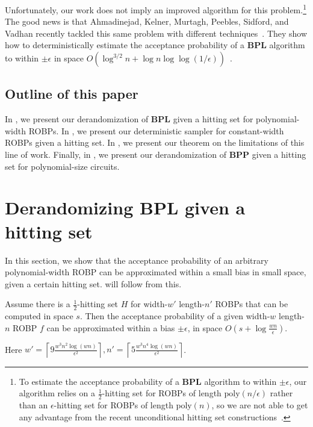 Unfortunately, our work does not imply an improved algorithm for this problem.\footnote{To estimate the acceptance probability of a $\mathbf{BPL}$ algorithm to within $\pm \epsilon$, our algorithm relies on a $\frac{1}{2}$-hitting set for ROBPs of length $\text{poly}(n/\epsilon)$ rather than an $\epsilon$-hitting set for ROBPs of length $\text{poly}(n)$, so we are not able to get any advantage from the recent unconditional hitting set constructions~\cite{BCG20,HZ20,CL20,CDRSTS21,PV21,Hoz21}.} The good news is that Ahmadinejad, Kelner, Murtagh, Peebles, Sidford, and Vadhan recently tackled this same problem with different techniques~\cite{AKMPSV20}. They show how to deterministically estimate the acceptance probability of a $\mathbf{BPL}$ algorithm to within $\pm \epsilon$ in space $O(\log^{3/2} n + \log n \log \log(1/\epsilon))$~\cite{AKMPSV20}.

\subsection{Outline of this paper}

In , we present our derandomization of $\mathbf{BPL}$ given a hitting set for polynomial-width ROBPs. In , we present our deterministic sampler for constant-width ROBPs given a hitting set. In , we present our theorem on the limitations of this line of work. Finally, in , we present our derandomization of $\mathbf{BPP}$ given a hitting set for polynomial-size circuits.

\section{Derandomizing $\mathbf{BPL}$ given a hitting set}
\label{sec:polywidth}

In this section, we show that the acceptance probability of an arbitrary polynomial-width ROBP can be approximated within a small bias in small space, given a certain hitting set.
 will follow from this.

\begin{theorem} \label{thm:HSGDerandROBP}
Assume there is a $\frac{1}{2}$-hitting set $H$  for width-$w'$ length-$n'$ ROBPs that can be computed in space $s$. Then the acceptance probability of a given width-$w$  length-$n$ ROBP $f$ can be approximated within a bias $\pm \epsilon$, in space $O(s+\log \frac{wn}{\epsilon})$.

Here $w'= \left \lceil 9 \frac{w^3 n^2  \log (wn) }{\epsilon^2} \right\rceil, n' = \left \lceil 5\frac{w^3n^4  \log (wn) }{\epsilon^2} \right \rceil$.
\end{theorem}

